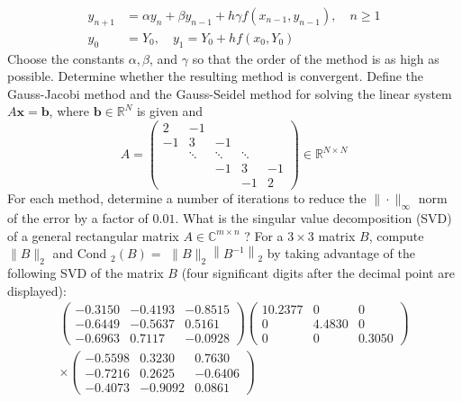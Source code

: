 \documentclass[14pt]{extarticle}
\begin{document}
$$
\begin{aligned}
y_{n+1} &=\alpha y_{n}+\beta y_{n-1}+h \gamma f\left(x_{n-1}, y_{n-1}\right), \quad n \geq 1 \\
y_{0} &=Y_{0}, \quad y_{1}=Y_{0}+h f\left(x_{0}, Y_{0}\right)
\end{aligned}
$$
Choose the constants $\alpha, \beta$, and $\gamma$ so that the order of the method is as high as possible. Determine whether the resulting method is convergent.
\newpage
Define the Gauss-Jacobi method and the Gauss-Seidel method for solving the linear system $A \mathbf{x}=\mathbf{b}$, where $\mathbf{b} \in \mathbb{R}^{N}$ is given and
$$
A=\left(\begin{array}{ccccc}
2 & -1 & & & \\
-1 & 3 & -1 & & \\
& \ddots & \ddots & \ddots & \\
& & -1 & 3 & -1 \\
& & & -1 & 2
\end{array}\right) \in \mathbb{R}^{N \times N}
$$
For each method, determine a number of iterations to reduce the $\|\cdot\|_{\infty}$ norm of the error by a factor of $0.01$.
\newpage
What is the singular value decomposition (SVD) of a general rectangular matrix $A \in \mathbb{C}^{m \times n}$ ? For a $3 \times 3$ matrix $B$, compute $\|B\|_{2}$ and Cond $_{2}(B)=$ $\|B\|_{2}\left\|B^{-1}\right\|_{2}$ by taking advantage of the following SVD of the matrix $B$ (four significant digits after the decimal point are displayed):
$$
\begin{gathered}
\left(\begin{array}{rrr}
-0.3150 & -0.4193 & -0.8515 \\
-0.6449 & -0.5637 & 0.5161 \\
-0.6963 & 0.7117 & -0.0928
\end{array}\right)\left(\begin{array}{rrrr}
10.2377 & 0 & 0 \\
0 & 4.4830 & 0 \\
0 & 0 & 0.3050
\end{array}\right) \\
\times\left(\begin{array}{rrr}
-0.5598 & 0.3230 & 0.7630 \\
-0.7216 & 0.2625 & -0.6406 \\
-0.4073 & -0.9092 & 0.0861
\end{array}\right)
\end{gathered}
$$
\end{document}
